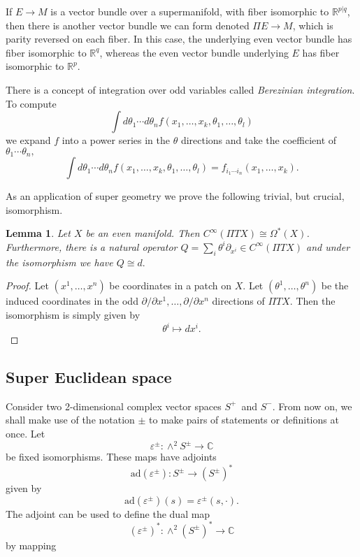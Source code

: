 \documentclass[twoside]{amsart}
\newcommand{\CC}{\ensuremath{\mathbb{C}}}
\newcommand{\RR}{\ensuremath{\mathbb{R}}}
\newtheorem{lemma}{Lemma}
\renewcommand{\epsilon}{\varepsilon}
\newcommand{\enm}[1]{\ensuremath{#1}}
\newcommand{\superijk}[3]{\enm{{#1}^{#2|#3}}}
\newcommand{\rrpq}{\superijk{\RR}{p}{q}}
\newcommand{\ad}{\enm{\mathrm{ad}}}
\newcommand{\formsij}[2]{\ensuremath{\Omega^{#1}({#2})}}
\newcommand{\spl}{\enm{S^{+}}}
\newcommand{\sm}{\enm{S^{-}}}
\newcommand{\spm}{\enm{S^{\pm}}}
\newcommand{\eps}{\enm{\epsilon}}
\renewcommand{\epsilon}{\varepsilon}
\begin{document}
If \( E\to M \) is a vector bundle over a supermanifold, with fiber
isomorphic to \rrpq, then there is another vector bundle we can form
denoted \( \Pi E\to M \), which is parity reversed on each fiber.  In
this case, the underlying even vector bundle has fiber isomorphic to
\( \RR^q \), whereas the even vector bundle underlying \( E \) has
fiber isomorphic to \( \RR^p \).

There is a concept of integration over odd variables called
\emph{Berezinian integration}.  To compute
\[ \int d\theta_{1}\cdots d\theta_{n} f(x_{1}, \ldots, x_{k},
\theta_{1}, \ldots, \theta_{l}) \]
we expand \( f \) into a power series in the \( \theta \) directions
and take the coefficient of \( \theta_{1}\cdots\theta_{n}, \)
\[ \int d\theta_{1}\cdots d\theta_{n} f(x_{1}, \ldots, x_{k},
\theta_{1}, \ldots, \theta_{l}) = f_{i_{1}\cdots i_{n}}(x_{1},\ldots,
x_{k}). \]

As an application of super geometry we prove the following trivial,
but crucial, isomorphism.
\begin{lemma}
   \label{lemma:functionsforms}
   Let \( X \) be an even manifold. Then \( C^{\infty}(\Pi
TX)\cong    \formsij{*}{X} \).  Furthermore, there is a natural
operator \( Q=\sum_{i}\theta^{i}\partial_{x^{i}}\in C^{\infty}(\Pi TX)
\) and under the isomorphism we have \( Q\cong d. \)
\end{lemma}
\begin{proof} Let \( (x^1,\ldots,x^n) \) be coordinates in a patch on \( X
\).  Let \( (\theta^1, \ldots, \theta^n) \) be the induced
coordinates in the odd \( \partial/\partial x^1, \ldots,
\partial/\partial x^n \) directions of \( \Pi TX \).  Then the isomorphism is simply
given by
\[ \theta^i\mapsto dx^i. \]
\end{proof}

\subsection{Super Euclidean space}
Consider two 2-dimensional complex vector spaces \spl\ and \sm.  From now on, we shall make use of the notation \( \pm \) to make pairs of statements or definitions at once.  Let
\[ \eps^{\pm}:\wedge^{2}\spm\to \CC \] be fixed isomorphisms.  These
maps have adjoints
\[ \ad(\eps^{\pm}): \spm\to (\spm)^{*} \]
given by
\[ \ad(\eps^{\pm})(s) = \eps^{\pm}(s, \cdot). \]
The adjoint can be used to define the dual map
\[ (\eps^{\pm})^{*}:\wedge^{2}(\spm)^{*}\to\CC \]
by mapping
\end{document}
